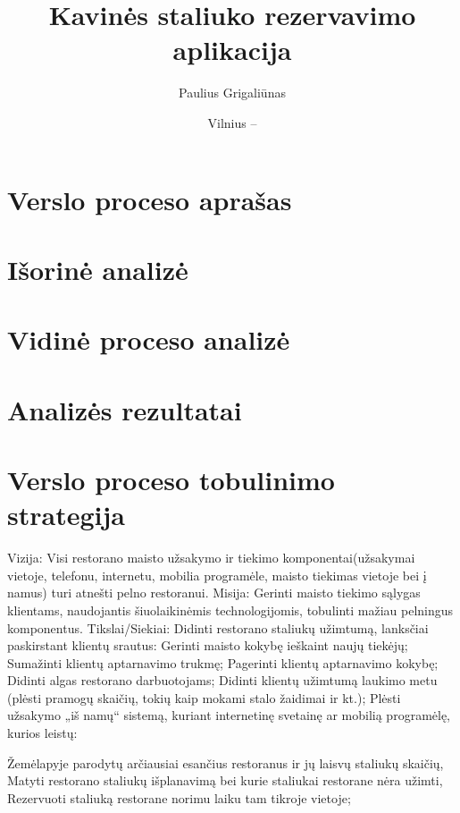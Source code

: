 \documentclass{VUMIFPSkursinis}
\title{Kavinės staliuko rezervavimo aplikacija}
\author{Paulius Grigaliūnas}
\date{Vilnius – \the\year}
\begin{document}
\maketitle
\cleardoublepage{}
\setcounter{page}{2}



\noindent


\tableofcontents

\noindent

\section{Verslo proceso aprašas}

\section{Išorinė analizė}

\section{Vidinė proceso analizė}

\section{Analizės rezultatai}

\section{Verslo proceso tobulinimo strategija}
Vizija:	Visi restorano maisto užsakymo ir tiekimo komponentai(užsakymai vietoje, telefonu, internetu, mobilia programėle, maisto tiekimas vietoje bei į namus) turi atnešti pelno restoranui.
Misija: Gerinti maisto tiekimo sąlygas klientams, naudojantis šiuolaikinėmis technologijomis, tobulinti mažiau pelningus komponentus.
Tikslai/Siekiai:
Didinti restorano staliukų užimtumą, lanksčiai paskirstant klientų srautus:
Gerinti maisto kokybę ieškaint naujų tiekėjų;
Sumažinti klientų aptarnavimo trukmę;
Pagerinti klientų aptarnavimo kokybę;
Didinti algas restorano darbuotojams;
Didinti klientų užimtumą laukimo metu (plėsti pramogų skaičių, tokių kaip mokami stalo žaidimai ir kt.);
Plėsti užsakymo „iš namų“ sistemą, kuriant internetinę svetainę ar mobilią programėlę, kurios leistų:

Žemėlapyje parodytų arčiausiai esančius restoranus ir jų laisvų staliukų skaičių,
Matyti restorano staliukų išplanavimą bei kurie staliukai restorane nėra užimti,
Rezervuoti staliuką restorane norimu laiku tam tikroje vietoje;
\end{document}
